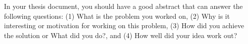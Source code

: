 In your thesis document, you should have a good abstract that can answer the following questions: (1) What is the problem you worked on, (2) Why is it interesting or motivation for working on this problem, (3) How did you achieve the solution or What did you do?, and (4) How well did your idea work out?

